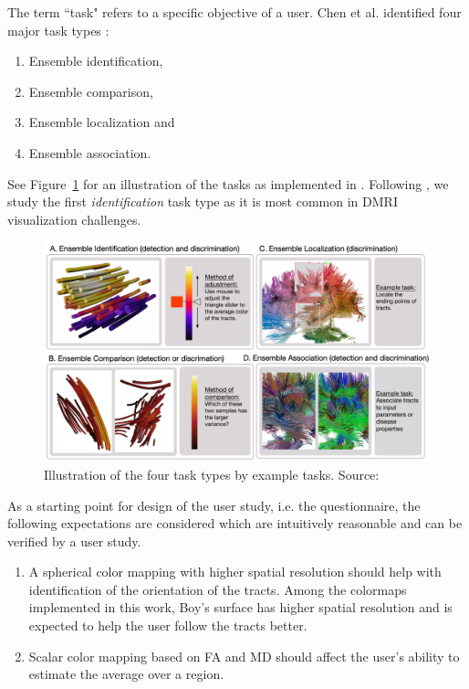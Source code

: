 \documentclass[hyperref, plainreport, noproblem]{cgvpub1}
\begin{document}
The term ``task" refers to a specific objective of a user. Chen et al. \cite{chen} identified four major task types : 
\begin{enumerate}
	\item Ensemble identification, 
	\item Ensemble comparison, 
	\item Ensemble localization and
	\item Ensemble association.
\end{enumerate}
See Figure~\ref{fig:task-types} for an illustration of the tasks as implemented in \cite{chen}. Following \cite{chen}, we study the first \emph{identification} task type as it is most common in DMRI visualization challenges. 

\begin{figure}[ht]
    \centering
    \includegraphics[width = 0.9\columnwidth]{task-types}
    \caption{Illustration of the four task types by example tasks. Source:  \cite{chen}}
    \label{fig:task-types}
\end{figure}

As a starting point for design of the user study, i.e. the questionnaire, the following expectations are considered which are intuitively reasonable and can be verified by a user study.
\begin{enumerate}
	\item A spherical color mapping with higher spatial resolution should help with identification of the orientation of the tracts. Among the colormaps implemented in this work, Boy's surface has higher spatial resolution and is expected to help the user follow the tracts better.
	\item Scalar color mapping based on FA and MD should affect the user's ability to estimate the average over a region.
\end{enumerate}
\end{document}
